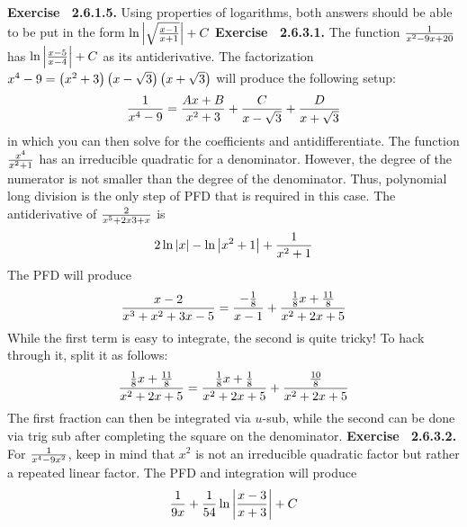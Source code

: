  {\noindent \protect \bf  Exercise ~2.6.1.5.} Using properties of logarithms, both answers should be able to be put in the form $\protect \qopname  \relax o{ln}\left | \protect \sqrt  {\protect \frac  {x-1}{x+1}}\right |+C$ \protect \newline  \protect \newline  
 {\noindent \protect \bf  Exercise ~2.6.3.1.} \textbullet The function $\protect \frac  {1}{x^2-9x+20}$ has $\protect \qopname  \relax o{ln}\left |\protect \frac  {x-5}{x-4}\right |+C$ as its antiderivative. \textbullet The factorization $x^4-9=\left (x^2+3\right )\left (x-\protect \sqrt  {3}\right )\left (x+\protect \sqrt  {3}\right )$ will produce the following setup: $$\protect \frac  {1}{x^4-9}=\protect \frac  {Ax+B}{x^2+3}+\protect \frac  {C}{x-\protect \sqrt  {3}}+\protect \frac  {D}{x+\protect \sqrt  {3}} $$ in which you can then solve for the coefficients and antidifferentiate. \textbullet The function $\protect \frac  {x^4}{x^2+1}$ has an irreducible quadratic for a denominator. However, the degree of the numerator is not smaller than the degree of the denominator. Thus, polynomial long division is the only step of PFD that is required in this case. \textbullet The antiderivative of $\protect \frac  {2}{x^5+2x3+x}$ is $$2\protect \qopname  \relax o{ln}|x|-\protect \qopname  \relax o{ln}\left | x^2+1\right |+\protect \frac  {1}{x^2+1}$$ \textbullet The PFD will produce $$ \protect \frac  {x-2}{x^3+x^2+3x-5}=\protect \frac  {-\protect \frac  {1}{8}}{x-1}+\protect \frac  {\protect \frac  {1}{8}x+\protect \frac  {11}{8}}{x^2+2x+5}$$ While the first term is easy to integrate, the second is quite tricky! To hack through it, split it as follows: $$\protect \frac  {\protect \frac  {1}{8}x+\protect \frac  {11}{8}}{x^2+2x+5}=\protect \frac  {\protect \frac  {1}{8}x+\protect \frac  {1}{8}}{x^2+2x+5}+\protect \frac  {\protect \frac  {10}{8}}{x^2+2x+5} $$ The first fraction can then be integrated via $u$-sub, while the second can be done via trig sub after completing the square on the denominator. \protect \newline  \protect \newline  
 {\noindent \protect \bf  Exercise ~2.6.3.2.} For $\protect \frac  {1}{x^4-9x^2}$, keep in mind that $x^2$ is not an irreducible quadratic factor but rather a repeated linear factor. The PFD and integration will produce $$\protect \frac  {1}{9x}+\protect \frac  {1}{54}\protect \qopname  \relax o{ln}\left |\protect \frac  {x-3}{x+3}\right |+C $$  \protect \newline  \protect \newline  
